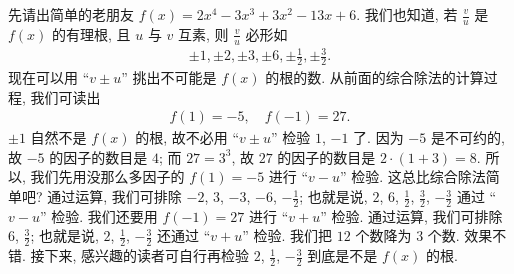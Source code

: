 \begin{example}
    先请出简单的老朋友 $f(x) = 2x^4 - 3x^3 + 3x^2 - 13x + 6$. 我们也知道, 若 $\frac{v}{u}$ 是 $f(x)$ 的有理根, 且 $u$ 与 $v$ 互素, 则 $\frac{v}{u}$ 必形如
    \begin{align*}
        \pm 1, \pm 2, \pm 3, \pm 6, \pm \frac{1}{2}, \pm \frac{3}{2}.
    \end{align*}
    现在可以用 ``$v \pm u$'' 挑出不可能是 $f(x)$ 的根的数. 从前面的综合除法的计算过程, 我们可读出
    \begin{align*}
        f(1) = -5, \quad f(-1) = 27.
    \end{align*}
    $\pm 1$ 自然不是 $f(x)$ 的根, 故不必用 ``$v \pm u$'' 检验 $1$, $-1$ 了. 因为 $-5$ 是不可约的, 故 $-5$ 的因子的数目是 $4$; 而 $27 = 3^3$, 故 $27$ 的因子的数目是 $2 \cdot (1+3) = 8$. 所以, 我们先用没那么多因子的 $f(1) = -5$ 进行 ``$v - u$'' 检验. 这总比综合除法简单吧? 通过运算, 我们可排除 $-2$, $3$, $-3$, $-6$, $-\frac{1}{2}$; 也就是说, $2$, $6$, $\frac{1}{2}$, $\frac{3}{2}$, $-\frac{3}{2}$ 通过 ``$v - u$'' 检验. 我们还要用 $f(-1) = 27$ 进行 ``$v + u$'' 检验. 通过运算, 我们可排除 $6$, $\frac{3}{2}$; 也就是说, $2$, $\frac{1}{2}$, $-\frac{3}{2}$ 还通过 ``$v + u$'' 检验. 我们把 $12$ 个数降为 $3$ 个数. 效果不错. 接下来, 感兴趣的读者可自行再检验 $2$, $\frac{1}{2}$, $-\frac{3}{2}$ 到底是不是 $f(x)$ 的根.
\end{example}

